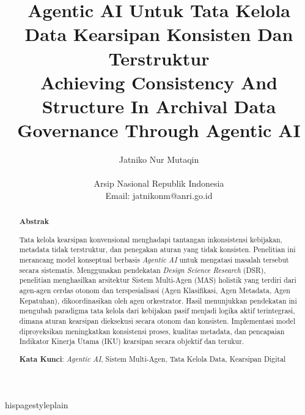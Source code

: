 \documentclass[12pt,a4paper]{article}
\title{
{\fontsize{16}{19}\selectfont\bfseries Agentic AI Untuk Tata Kelola Data Kearsipan Konsisten Dan Terstruktur}
\vspace{10pt} \\
{\fontsize{16}{19}\selectfont\bfseries Achieving Consistency And Structure In Archival Data Governance Through Agentic AI}
}
\author{Jatniko Nur Mutaqin \\ \\ Arsip Nasional Republik Indonesia \\ Email: jatnikonm@anri.go.id}
\date{}
\begin{document}
\maketitle
	hispagestyle{plain}
\begin{abstract}
\normalsize
\centering
\textbf{Abstrak}

Tata kelola kearsipan konvensional menghadapi tantangan inkonsistensi kebijakan, metadata tidak terstruktur, dan penegakan aturan yang tidak konsisten. Penelitian ini merancang model konseptual berbasis \emph{Agentic AI} untuk mengatasi masalah tersebut secara sistematis. Menggunakan pendekatan \emph{Design Science Research} (DSR), penelitian menghasilkan arsitektur Sistem Multi-Agen (MAS) holistik yang terdiri dari agen-agen cerdas otonom dan terspesialisasi (Agen Klasifikasi, Agen Metadata, Agen Kepatuhan), dikoordinasikan oleh agen orkestrator. Hasil menunjukkan pendekatan ini mengubah paradigma tata kelola dari kebijakan pasif menjadi logika aktif terintegrasi, dimana aturan kearsipan dieksekusi secara otonom dan konsisten. Implementasi model diproyeksikan meningkatkan konsistensi proses, kualitas metadata, dan pencapaian Indikator Kinerja Utama (IKU) kearsipan secara objektif dan terukur.

\textbf{Kata Kunci}: \emph{Agentic AI}, Sistem Multi-Agen, Tata Kelola Data, Kearsipan Digital
\end{abstract}

\renewcommand{\abstractname}{}
\end{document}
